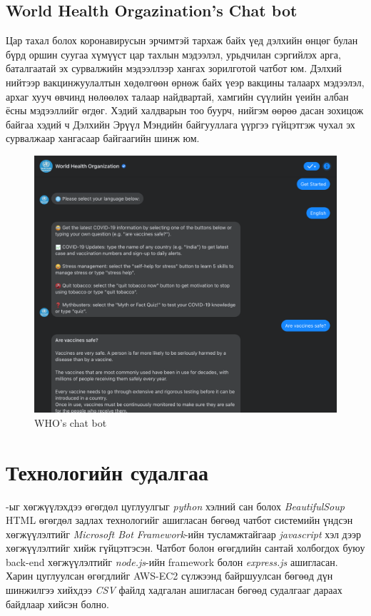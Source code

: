 \subsection{World Health Orgazination's Chat bot}
Цар тахал болох коронавирусын эрчимтэй тархаж байх үед дэлхийн өнцөг булан бүрд оршин суугаа хүмүүст цар тахлын мэдээлэл, урьдчилан сэргийлэх арга, баталгаатай эх сурвалжийн мэдээллээр хангах зорилготой чатбот юм.
Дэлхий нийтээр вакцинжуулалтын хөдөлгөөн өрнөж байх үеэр вакцины талаарх мэдээлэл, архаг хууч өвчинд нөлөөлөх талаар найдвартай, хамгийн сүүлийн үеийн албан ёсны мэдээллийг өгдөг. Хэдий халдварын тоо буурч, нийгэм өөрөө дасан зохицож байгаа хэдий ч Дэлхийн Эрүүл Мэндийн байгууллага үүргээ гүйцэтгэж чухал эх сурвалжаар хангасаар байгаагийн шинж юм. 
\begin{figure}[ht]
  \centering
  \includegraphics[width=\textwidth-4cm]{images/whoBOT.png}
  \caption{WHO's chat bot}\label{fig:chatbotWHO}
\end{figure}
\section{Технологийн судалгаа}
\@title-ыг хөгжүүлэхдээ өгөгдөл цуглуулгыг \textit{python} хэлний сан болох \textit{BeautifulSoup} HTML өгөгдөл задлах технологийг ашигласан бөгөөд чатбот системийн үндсэн хөгжүүлэлтийг \textit{Microsoft Bot Framework}-ийн тусламжтайгаар \textit{javascript} хэл дээр хөгжүүлэлтийг хийж гүйцэтгэсэн. Чатбот болон өгөгдлийн сантай холбогдох буюу back-end хөгжүүлэлтийг \textit{node.js}-ийн framework болон \textit{express.js} ашигласан. Харин цуглуулсан өгөгдлийг AWS-EC2 сүлжээнд байршуулсан бөгөөд дүн шинжилгээ хийхдээ \textit{CSV} файлд хадгалан ашигласан бөгөөд судалгааг дараах байдлаар хийсэн болно. 
